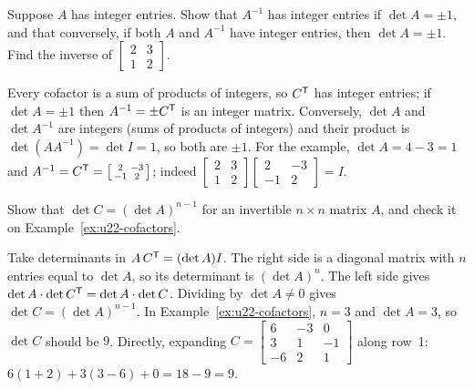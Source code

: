 \begin{exercise}\label{exr:u22-integer}
Suppose $A$ has integer entries. Show that $A^{-1}$ has integer entries if $\det A=\pm1$,
and that conversely, if both $A$ and $A^{-1}$ have integer entries, then $\det A=\pm1$.
Find the inverse of $\left[\begin{smallmatrix} 2&3\\ 1&2\end{smallmatrix}\right]$.
\end{exercise}
\begin{solution}
Every cofactor is a sum of products of integers, so $C^{\mathsf{T}}$ has integer entries; if
$\det A=\pm1$ then $A^{-1}=\pm C^{\mathsf{T}}$ is an integer matrix. Conversely, $\det A$ and
$\det A^{-1}$ are integers (sums of products of integers) and their product is
$\det(AA^{-1})=\det I=1$, so both are $\pm1$. For the example, $\det A=4-3=1$ and
$A^{-1}=C^{\mathsf{T}}=\left[\begin{smallmatrix} 2&-3\\ -1&2\end{smallmatrix}\right]$; indeed
$\left[\begin{smallmatrix} 2&3\\ 1&2\end{smallmatrix}\right]
\left[\begin{smallmatrix} 2&-3\\ -1&2\end{smallmatrix}\right]=I$.
\end{solution}

\begin{exercise}\label{exr:u22-detC}
Show that $\det C=(\det A)^{n-1}$ for an invertible $n\times n$ matrix $A$, and check it on
Example~\ref{ex:u22-cofactors}.
\end{exercise}
\begin{solution}
Take determinants in $A\,C^{\mathsf{T}}=(\det A)I$. The right side is a diagonal matrix with $n$ entries
equal to $\det A$, so its determinant is $(\det A)^{n}$. The left side gives
$\det A\cdot\det C^{\mathsf{T}}=\det A\cdot\det C$. Dividing by $\det A\neq0$ gives
$\det C=(\det A)^{n-1}$. In Example~\ref{ex:u22-cofactors}, $n=3$ and $\det A=3$, so
$\det C$ should be $9$. Directly, expanding
$C=\left[\begin{smallmatrix} 6&-3&0\\ 3&1&-1\\ -6&2&1\end{smallmatrix}\right]$ along row~1:
$6(1+2)+3(3-6)+0=18-9=9$.
\end{solution}

